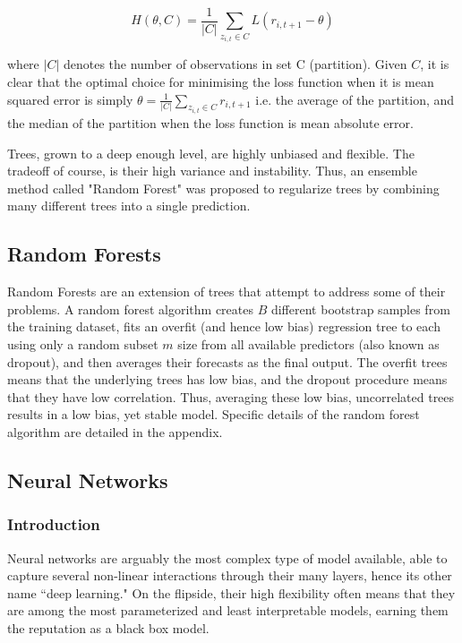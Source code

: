 \documentclass[a4paper]{article}
\begin{document}
	\begin{equation}
	H(\theta, C) = \frac{1}{|C|} \sum_{z_{i,t} \in C} L(r_{i,t+1} - \theta)
	\end{equation}
	
	where $|C|$ denotes the number of observations in set C (partition). Given $C$, it is clear that the optimal choice for minimising the loss function when it is mean squared error is simply $\theta = \frac{1}{|C|} \sum_{z_{i,t}\in C}^{ }r_{i,t+1}$ i.e. the average of the partition, and the median of the partition when the loss function is mean absolute error.
	
	Trees, grown to a deep enough level, are highly unbiased and flexible. The tradeoff of course, is their high variance and instability. Thus, an ensemble method called "Random Forest" was proposed to regularize trees by combining many different trees into a single prediction.
	
	\subsection{Random Forests}
	Random Forests are an extension of trees that attempt to address some of their problems. A random forest algorithm creates $B$ different bootstrap samples from the training dataset, fits an overfit (and hence low bias) regression tree to each using only a random subset $m$ size from all available predictors (also known as dropout), and then averages their forecasts as the final output. The overfit trees means that the underlying trees has low bias, and the dropout procedure means that they have low correlation. Thus, averaging these low bias, uncorrelated trees results in a low bias, yet stable model. Specific details of the random forest algorithm are detailed in the appendix.
	
	\pagebreak
	
	\subsection{Neural Networks}
	
	\subsubsection{Introduction}
	
	Neural networks are arguably the most complex type of model available, able to capture several non-linear interactions through their many layers, hence its other name ``deep learning." On the flipside, their high flexibility often means that they are among the most parameterized and least interpretable models, earning them the reputation as a black box model.
	
\end{document}
